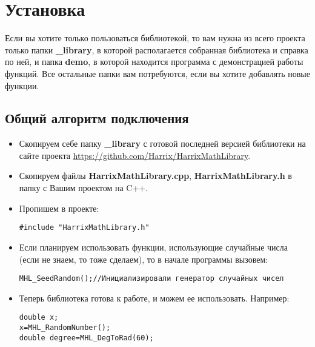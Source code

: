 \newpage
\section{Установка}\label{section_install}

Если вы хотите только пользоваться библиотекой, то вам нужна из всего проекта только папки \textbf{\_library}, в которой располагается собранная библиотека и справка по ней, и папка \textbf{demo}, в которой находится программа с демонстрацией работы функций. Все остальные папки вам потребуются, если вы хотите добавлять новые функции.

\subsection{Общий алгоритм подключения}

\begin{itemize}
\item Скопируем себе папку \textbf{\_library} с готовой последней версией библиотеки на сайте проекта \href{https://github.com/Harrix/HarrixMathLibrary}{https://github.com/Harrix/HarrixMathLibrary}.

\item Скопируем файлы \textbf{HarrixMathLibrary.cpp}, \textbf{HarrixMathLibrary.h} в папку с Вашим проектом на C++.

\item Пропишем в проекте:
\begin{lstlisting}[label=install_01,caption=Подключение библиотеки]
#include "HarrixMathLibrary.h"
\end{lstlisting}

\item Если планируем использовать функции, использующие случайные числа (если не знаем, то тоже сделаем), то в начале программы вызовем:
\begin{lstlisting}[label=install_02,caption=Инициализация генератора случайных чисел]
MHL_SeedRandom();//Инициализировали генератор случайных чисел
\end{lstlisting}

\item Теперь библиотека готова к работе, и можем ее использовать. Например:
\begin{lstlisting}[label=install_03,caption=Пример использования]
double x;
x=MHL_RandomNumber();
double degree=MHL_DegToRad(60);
\end{lstlisting}
\end{itemize}


